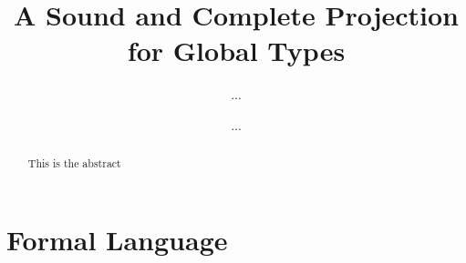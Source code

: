 \documentclass[a4paper,UKenglish,cleveref, autoref, thm-restate]{lipics-v2021}
\title{A Sound and Complete Projection for Global
  Types} %
\author{...}{}{}{}{}%
\author{...}{}{}{}{}
\begin{document}
\maketitle

\begin{abstract}
  This is the abstract
\end{abstract}

\section{Formal Language} 


 

 

 
\end{document}
